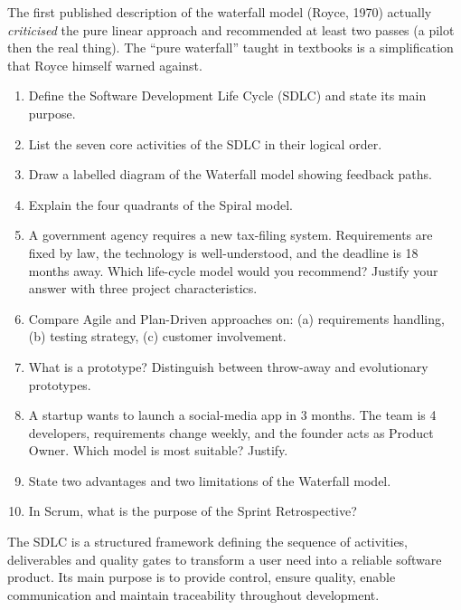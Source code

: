 \documentclass[11pt]{article}
\begin{document}
\begin{savaistu}
The first published description of the waterfall model (Royce, 1970) actually \emph{criticised} the pure linear approach and recommended at least two passes (a pilot then the real thing). The ``pure waterfall'' taught in textbooks is a simplification that Royce himself warned against.
\end{savaistu}

\begin{exercice}
\begin{enumerate}
\item Define the Software Development Life Cycle (SDLC) and state its main purpose.
\item List the seven core activities of the SDLC in their logical order.
\item Draw a labelled diagram of the Waterfall model showing feedback paths.
\item Explain the four quadrants of the Spiral model.
\item A government agency requires a new tax-filing system. Requirements are fixed by law, the technology is well-understood, and the deadline is 18 months away. Which life-cycle model would you recommend? Justify your answer with three project characteristics.
\item Compare Agile and Plan-Driven approaches on: (a) requirements handling, (b) testing strategy, (c) customer involvement.
\item What is a prototype? Distinguish between throw-away and evolutionary prototypes.
\item A startup wants to launch a social-media app in 3 months. The team is 4 developers, requirements change weekly, and the founder acts as Product Owner. Which model is most suitable? Justify.
\item State two advantages and two limitations of the Waterfall model.
\item In Scrum, what is the purpose of the Sprint Retrospective?
\end{enumerate}
\end{exercice}

\begin{corrige}[Exercise 1]
The SDLC is a structured framework defining the sequence of activities, deliverables and quality gates to transform a user need into a reliable software product. Its main purpose is to provide control, ensure quality, enable communication and maintain traceability throughout development.
\end{corrige}
\end{document}
